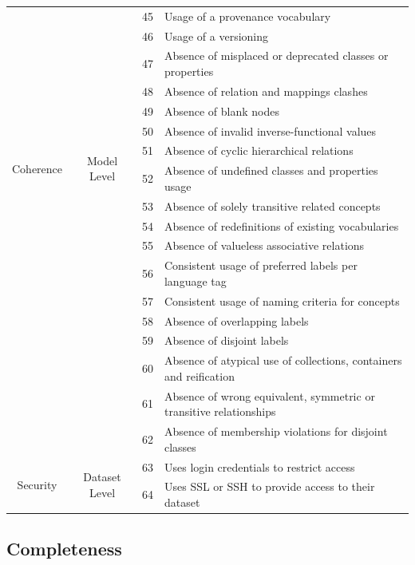 \documentclass[onecolumn, crcready]{iosart2c}
\begin{document}
\begin{center}
{\begin{longtable}[h]{|c|c|c|l|}
\cline{3-4}
 &  & 45 & Usage of a provenance vocabulary\tabularnewline
 \cline{3-4}
 &  & 46 & Usage of a versioning\tabularnewline
\hline
\hline
\multirow{10}{*}{Coherence} & \multirow{10}{*}{Model Level} & 47 & Absence of misplaced or deprecated classes or properties  \cite{Hogan2010}\tabularnewline
\cline{3-4}
 &  & 48 & Absence of relation and mappings clashes  \cite{Suominen:2012:IQS:2413941.2413985}\tabularnewline
\cline{3-4}
 &  & 49 & Absence of blank nodes \cite{Hogan:2012:ESL:2263498.2264570}\tabularnewline
\cline{3-4}
 &  & 50 & Absence of invalid inverse-functional values \cite{Hogan2010}\tabularnewline
\cline{3-4}
 &  & 51 & Absence of cyclic hierarchical relations \cite{conf/jcdl/Soergel05}\cite{Suominen:2012:IQS:2413941.2413985}\cite{Mader2012}\tabularnewline
\cline{3-4}
 &  & 52 & Absence of undefined classes and properties usage \cite{Hogan2010}\tabularnewline
\cline{3-4}
 &  & 53 & Absence of solely transitive related concepts \cite{Mader2012}\tabularnewline
\cline{3-4}
 &  & 54 & Absence of redefinitions of existing vocabularies  \cite{Hogan2010}\tabularnewline
\cline{3-4}
 &  & 55 & Absence of valueless associative relations  \cite{Mader2012}\tabularnewline
\hline
\hline
\multirow{7}{*}{Consistency}
 & \multirow{7}{*}{Model Level}
& 56 & Consistent usage of preferred labels per language tag \cite{skosprimer}\cite{Mader2012}\tabularnewline
 \cline{3-4}
 & & 57 & Consistent usage of naming criteria for concepts \cite{DBLP:conf/ic3k/KeetSP13}\tabularnewline
\cline{3-4}
 &  & 58 & Absence of overlapping labels\tabularnewline
\cline{3-4}
 &  & 59 & Absence of disjoint labels \cite{Mader2012}\tabularnewline
\cline{3-4}
 & & 60 & Absence of atypical use of collections, containers and reification \cite{Hogan2010}\tabularnewline
\cline{3-4}
 &  & 61 & Absence of wrong equivalent, symmetric or transitive relationships \cite{DBLP:conf/ic3k/KeetSP13}\tabularnewline
\cline{3-4}
 &  & 62 & Absence of membership violations for disjoint classes \cite{Hogan2010}\tabularnewline
\hline
\hline
\multirow{2}{*}{Security} & \multirow{2}{*}{Dataset Level} & 63 & Uses login credentials to restrict access \cite{Framework2012}\tabularnewline
\cline{3-4}
 &  & 64 & Uses SSL or SSH to provide access to their dataset \cite{Framework2012}\tabularnewline
\hline
\end{longtable}
}
\end{center}

 \subsection{Completeness}
\end{document}
